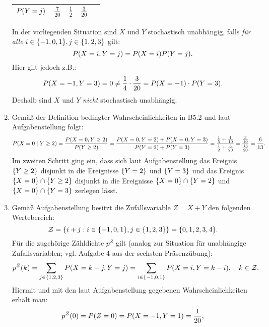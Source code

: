 \documentclass{exercise}
\begin{document}
\begin{enumerate}
\begin{center}
\begin{tabular}{cccccc}
                \multicolumn{2}{c}{\(P\parentheses*{Y = j}\)} & \(\frac{7}{20}\) & \(\frac{1}{2}\) & \(\frac{3}{20}\) &\\
                \bottomrule
            \end{tabular}
        \end{center}
        In der vorliegenden Situation sind \(X\) und \(Y\) stochastisch unabhängig, falls \emph{für alle} \(i \in \braces*{-1, 0, 1}, j \in \braces*{1, 2, 3}\) gilt:
        \[
            P\parentheses*{X = i, Y = j} = P\parentheses*{X = i}P\parentheses*{Y = j}.
        \]
        Hier gilt jedoch z.B.:
        \[
            P\parentheses*{X = -1, Y = 3} = 0 \ne \frac{1}{4} \cdot \frac{3}{20} = P\parentheses*{X = -1} \cdot P\parentheses*{Y = 3}.
        \]
        Deshalb sind \(X\) und \(Y\) \emph{nicht} stochastisch unabhängig.
        \item Gemäß der Definition bedingter Wahrscheinlichkeiten in B5.2 und laut Aufgabenstellung folgt:
        \[
            P\parentheses*{X = 0 \mid Y \ge 2} = \frac{P\parentheses*{X = 0, Y \ge 2}}{P\parentheses*{Y \ge 2}} = \frac{P\parentheses*{X = 0, Y = 2} + P\parentheses*{X = 0, Y = 3}}{P\parentheses*{Y = 2} + P\parentheses*{Y = 3}} = \frac{\frac{1}{5} + \frac{1}{10}}{\frac{1}{2} + \frac{3}{20}} = \frac{\frac{3}{10}}{\frac{13}{20}} = \frac{6}{13}.
        \]
        Im zweiten Schritt ging ein, dass sich laut Aufgabenstellung das Ereignis \(\braces*{Y \ge 2}\) disjunkt in die Ereignisse \(\braces*{Y = 2}\) und \(\braces*{Y= 3}\) und das Ereignis \(\braces*{X = 0} \cap \braces*{Y \ge 2}\) disjunkt in die Ereignisse \(\braces*{X = 0} \cap \braces*{Y = 2}\) und \(\braces*{X = 0} \cap \braces*{Y = 3}\) zerlegen lässt.
        \item Gemäß Aufgabenstellung besitzt die Zufallsvariable \(Z = X + Y\) den folgenden Wertebereich:
        \[
            \mathcal{Z} = \braces*{i + j : i \in \braces*{-1, 0, 1}, j \in \braces*{1, 2, 3}} = \braces*{0, 1, 2, 3, 4}.
        \]
        Für die zugehörige Zähldichte \(p^Z\) gilt (analog zur Situation für unabhängige Zufallsvariablen; vgl. Aufgabe 4 aus der sechsten Präsenzübung):
        \[
            p^Z\parentheses*{k} = \sum_{j \in \braces*{1, 2, 3}}P\parentheses*{X = k - j, Y = j} = \sum_{i \in \braces*{-1, 0, 1}}P\parentheses*{X = i, Y = k - i}, \quad k \in \mathcal{Z}.
        \]
        Hiermit und mit den laut Aufgabenstellung gegebenen Wahrscheinlichkeiten erhält man:
        \begin{align*}
            p^Z\parentheses*{0} &= P\parentheses*{Z = 0} = P\parentheses*{X = -1, Y = 1} = \frac{1}{20},\\

\end{align*}
\end{enumerate}
\end{document}

